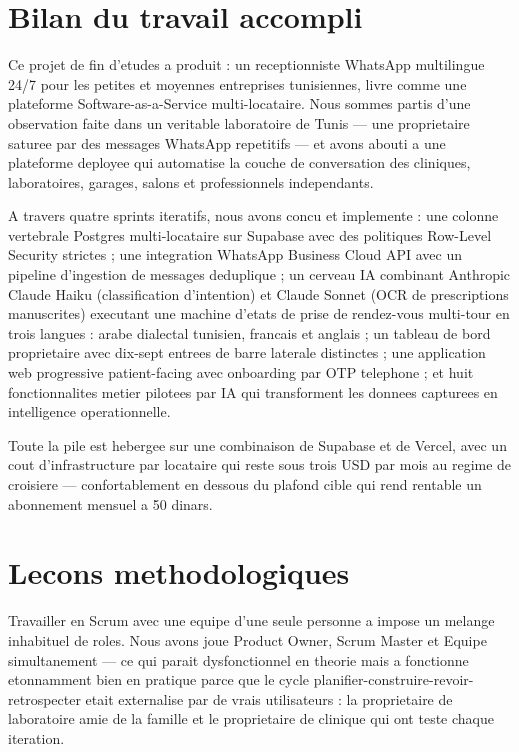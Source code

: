 \section*{Bilan du travail accompli}
Ce projet de fin d'etudes a produit \nova : un receptionniste WhatsApp
multilingue 24/7 pour les petites et moyennes entreprises tunisiennes,
livre comme une plateforme Software-as-a-Service multi-locataire. Nous
sommes partis d'une observation faite dans un veritable laboratoire de
Tunis --- une proprietaire saturee par des messages WhatsApp repetitifs
--- et avons abouti a une plateforme deployee qui automatise la couche
de conversation des cliniques, laboratoires, garages, salons et
professionnels independants.

A travers quatre sprints iteratifs, nous avons concu et implemente :
une colonne vertebrale Postgres multi-locataire sur Supabase avec des
politiques Row-Level Security strictes ; une integration WhatsApp
Business Cloud API avec un pipeline d'ingestion de messages
deduplique ; un cerveau IA combinant Anthropic Claude Haiku
(classification d'intention) et Claude Sonnet (OCR de prescriptions
manuscrites) executant une machine d'etats de prise de rendez-vous
multi-tour en trois langues : arabe dialectal tunisien, francais et
anglais ; un tableau de bord proprietaire avec dix-sept entrees de
barre laterale distinctes ; une application web progressive
patient-facing avec onboarding par OTP telephone ; et huit
fonctionnalites metier pilotees par IA qui transforment les donnees
capturees en intelligence operationnelle.

Toute la pile est hebergee sur une combinaison de Supabase et de
Vercel, avec un cout d'infrastructure par locataire qui reste sous
trois USD par mois au regime de croisiere --- confortablement en
dessous du plafond cible qui rend rentable un abonnement mensuel a
50 dinars.

\section*{Lecons methodologiques}
Travailler en Scrum avec une equipe d'une seule personne a impose un
melange inhabituel de roles. Nous avons joue Product Owner, Scrum
Master et Equipe simultanement --- ce qui parait dysfonctionnel en
theorie mais a fonctionne etonnamment bien en pratique parce que le
cycle planifier-construire-revoir-retrospecter etait externalise par
de vrais utilisateurs : la proprietaire de laboratoire amie de la
famille et le proprietaire de clinique qui ont teste chaque iteration.

